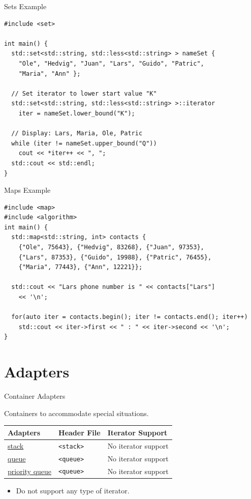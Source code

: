 \documentclass[14pt,aspectratio=1610]{beamer}
\begin{document}
\begin{frame}[fragile]{Sets Example}
\small
\begin{lstlisting}[basicstyle=\footnotesize\ttfamily]
#include <set>

int main() {
  std::set<std::string, std::less<std::string> > nameSet {
    "Ole", "Hedvig", "Juan", "Lars", "Guido", "Patric",
    "Maria", "Ann" };

  // Set iterator to lower start value "K"
  std::set<std::string, std::less<std::string> >::iterator
    iter = nameSet.lower_bound("K");

  // Display: Lars, Maria, Ole, Patric
  while (iter != nameSet.upper_bound("Q"))
    cout << *iter++ << ", ";
  std::cout << std::endl;
}
\end{lstlisting}
\end{frame}

\begin{frame}[fragile]{Maps Example}
\begin{lstlisting}[basicstyle=\footnotesize\ttfamily]
#include <map>
#include <algorithm>
int main() {
  std::map<std::string, int> contacts {
    {"Ole", 75643}, {"Hedvig", 83268}, {"Juan", 97353},
    {"Lars", 87353}, {"Guido", 19988}, {"Patric", 76455},
    {"Maria", 77443}, {"Ann", 12221}};

  std::cout << "Lars phone number is " << contacts["Lars"]
    << '\n';

  for(auto iter = contacts.begin(); iter != contacts.end(); iter++)
    std::cout << iter->first << " : " << iter->second << '\n';
}
\end{lstlisting}
\end{frame}


\section{Adapters}

\begin{frame}{Container Adapters}

Containers to accommodate special situations.\\[1em]

\begin{tabular}{l l l}
\toprule
  \textbf{\large Adapters} & \textbf{Header File} & \textbf{Iterator Support}\\
\midrule
  \href{https://en.cppreference.com/w/cpp/container/stack}{stack}
    & \lstinline{<stack>} & No iterator support\\
  \href{https://en.cppreference.com/w/cpp/container/queue}{queue}
    & \lstinline{<queue>} & No iterator support\\
  \href{https://en.cppreference.com/w/cpp/container/priority_queue}{priority queue}
    & \lstinline{<queue>} & No iterator support\\
\bottomrule
\end{tabular}

\begin{itemize}
\item
  Do not support any type of iterator.
\end{itemize}

\end{frame}
\end{document}
